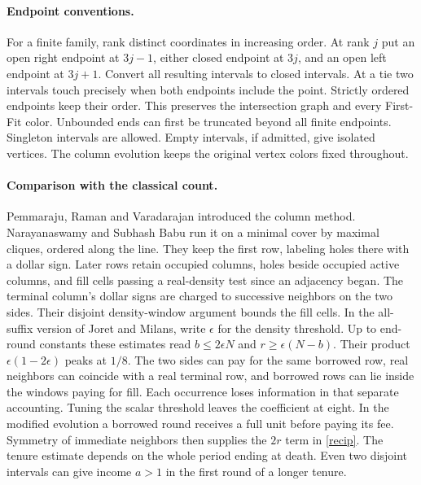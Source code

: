 \documentclass[11pt]{article}
\begin{document}
\paragraph{Endpoint conventions.}
For a finite family, rank distinct coordinates in increasing order.
At rank $j$ put an open right endpoint at $3j-1$, either closed endpoint
at $3j$, and an open left endpoint at $3j+1$. Convert all resulting
intervals to closed intervals. At a tie two intervals touch precisely
when both endpoints include the point. Strictly ordered endpoints keep
their order. This preserves the intersection graph and every First-Fit
color. Unbounded ends can first be truncated beyond all finite endpoints.
Singleton intervals are allowed. Empty intervals, if admitted, give
isolated vertices. The column evolution keeps the original vertex
colors fixed throughout.

\paragraph{Comparison with the classical count.}
Pemmaraju, Raman and Varadarajan introduced the column method.
Narayanaswamy and Subhash Babu run it on a minimal cover by maximal
cliques, ordered along the line. They keep the first row, labeling holes
there with a dollar sign. Later rows retain occupied columns, holes
beside occupied active columns, and fill cells passing a real-density
test since an adjacency began. The terminal column's dollar signs are
charged to successive neighbors on the two sides. Their disjoint
density-window argument bounds the fill cells. In the all-suffix version
of Joret and Milans, write $\epsilon$ for the density threshold. Up
to end-round constants these estimates read $b\le 2\epsilon N$ and
$r\ge\epsilon(N-b)$. Their product $\epsilon(1-2\epsilon)$ peaks at
$1/8$. The two sides can pay for the same borrowed row, real neighbors
can coincide with a real terminal row, and borrowed rows can lie
inside the windows paying for fill. Each occurrence loses information
in that separate accounting. Tuning the scalar threshold leaves the
coefficient at eight. In the modified evolution a borrowed round
receives a full unit before paying its fee. Symmetry of immediate
neighbors then supplies the $2r$ term in \eqref{recip}. The tenure
estimate depends on the whole period ending at death. Even two disjoint
intervals can give income $a>1$ in the first round of a longer tenure.
\end{document}
